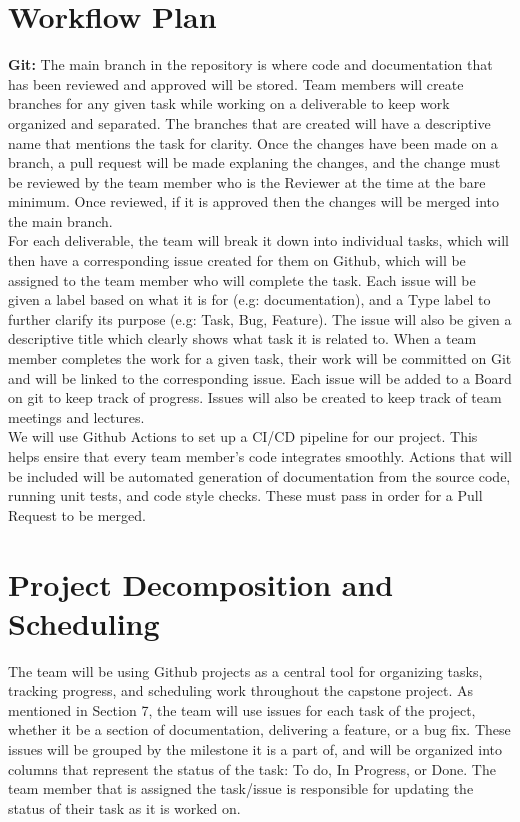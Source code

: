 \documentclass{article}
\begin{document}
\section{Workflow Plan}

{\bf Git:} The main branch in the repository is where code and documentation that has been reviewed and approved will be stored. Team members will create branches for any given task while working
on a deliverable to keep work organized and separated.  The branches that are created will have a descriptive name that mentions the task for clarity. Once the changes have been made on a branch, 
a pull request will be made explaning the changes, and the change must be reviewed by the team member who is the Reviewer at the time at the bare minimum. Once reviewed, if it is approved then the changes will be merged into the main branch. \\

 For each deliverable, the team will break it down into individual tasks, which will then have a corresponding issue created for them on Github, which will be assigned to the team member who will complete the task.
Each issue will be given a label based on what it is for (e.g: documentation), and a Type label to further clarify its purpose (e.g: Task, Bug, Feature). 
The issue will also be given a descriptive title which clearly shows what task it is related to. When a team member completes the work for a given task, their work will
be committed on Git and will be linked to the corresponding issue. Each issue will be added to a Board on git to keep track of progress. Issues will also be created to keep track of team meetings and lectures. \\

 We will use Github Actions to set up a CI/CD pipeline for our project. This helps ensire that every team member's code integrates smoothly. Actions that will be included will be
automated generation of documentation from the source code, running unit tests, and code style checks. These must pass in order for a Pull Request to be merged.
\section{Project Decomposition and Scheduling}

The team will be using Github projects as a central tool for organizing tasks, tracking progress, and scheduling work throughout the capstone project. As mentioned in Section 7,
the team will use issues for each task of the project, whether it be a section of documentation, delivering a feature, or a bug fix. These issues will be grouped by the milestone it
is a part of, and will be organized into columns that represent the status of the task: To do, In Progress, or Done. The team member that is assigned the task/issue is responsible
for updating the status of their task as it is worked on.\newline
\end{document}
